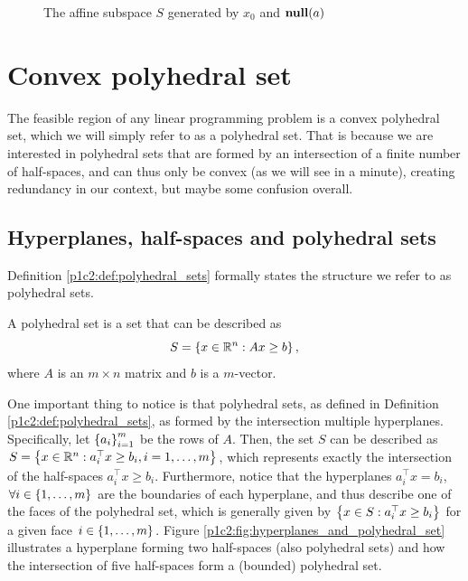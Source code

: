 \begin{figure}
	\caption{The affine subspace $S$ generated by $x_0$ and $\mathop{\bf null}(a)$} \label{p1c2:fig:nill_space_a}		
\end{figure}


\section{Convex polyhedral set}

The feasible region of any linear programming problem is a convex polyhedral set, which we will simply refer to as a polyhedral set. That is because we are interested in polyhedral sets that are formed by an intersection of a finite number of half-spaces, and can thus only be convex (as we will see in a minute), creating redundancy in our context, but maybe some confusion overall. 

\subsection{Hyperplanes, half-spaces and polyhedral sets}

Definition \ref{p1c2:def:polyhedral_sets} formally states the structure we refer to as polyhedral sets.
%
\begin{definition} \label{p1c2:def:polyhedral_sets}
	A polyhedral set is a set that can be described as
	$$
	S = \left\{ x \in \mathbb{R}^n : Ax \geq b \right \},	
	$$
	where $A$ is an $m \times n$ matrix and $b$ is a $m$-vector.
\end{definition}
%
One important thing to notice is that polyhedral sets, as defined in Definition \ref{p1c2:def:polyhedral_sets}, as formed by the intersection multiple hyperplanes. Specifically, let $\left\{ a_i \right \}_{i=1}^m$ be the rows of $A$. Then, the set $S$ can be described as $S = \left\{ x \in \mathbb{R}^n : a_i^\top x \geq b_i, i = 1,\dots, m \right \}$, which represents exactly the intersection of the half-spaces $a_i^\top x \geq b_i$. Furthermore, notice that the hyperplanes $a_i^\top x = b_i$, $\forall i \in \left\{ 1,\dots, m \right \}$ are the boundaries of each hyperplane, and thus describe one of the faces of the polyhedral set, which is generally given by $\left\{ x \in S : a_i^\top x \geq b_i \right \}$ for a given face $i \in \left\{ 1,\dots, m \right \}$. Figure \ref{p1c2:fig:hyperplanes_and_polyhedral_set} illustrates a hyperplane forming two half-spaces (also polyhedral sets) and how the intersection of five half-spaces form a (bounded) polyhedral set.

